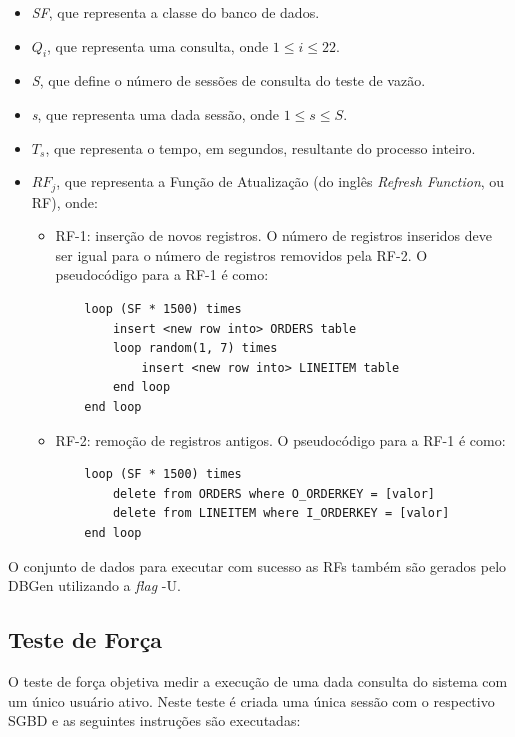 \begin{itemize}
	\item \textit{SF}, que representa a classe do banco de dados.
	\item \textit{$Q_{i}$}, que representa uma consulta, onde \mbox{$1 \le i \le 22$}.
	\item \textit{S}, que define o número de sessões de consulta do teste de vazão.
	\item \textit{s}, que representa uma dada sessão, onde \mbox{$1 \le s \le S$}.
	\item \textit{$T_{s}$}, que representa o tempo, em segundos, resultante do processo inteiro.
	\item \textit{$RF_{j}$}, que representa a Função de Atualização (do inglês \textit{Refresh Function}, ou RF), onde:
		\begin{itemize}
		    \item RF-1: inserção de novos registros. O número de registros inseridos deve ser igual para o número de registros removidos pela RF-2. O pseudocódigo para a RF-1 é como:
		
\begin{verbatim}
    loop (SF * 1500) times
        insert <new row into> ORDERS table
        loop random(1, 7) times
            insert <new row into> LINEITEM table
        end loop
    end loop
\end{verbatim}
		    \item RF-2: remoção de registros antigos. O pseudocódigo para a RF-1 é como:
		
\begin{verbatim}
    loop (SF * 1500) times
        delete from ORDERS where O_ORDERKEY = [valor]
        delete from LINEITEM where I_ORDERKEY = [valor]
    end loop
\end{verbatim}
		\end{itemize}
\end{itemize}

O conjunto de dados para executar com sucesso as RFs também são gerados pelo DBGen utilizando a \textit{flag} -U.

\subsection{Teste de Força}
\label{power_test}
O teste de força objetiva medir a execução de uma dada consulta do sistema com um único usuário ativo. Neste teste é criada uma única sessão com o respectivo SGBD e as seguintes instruções são executadas:

